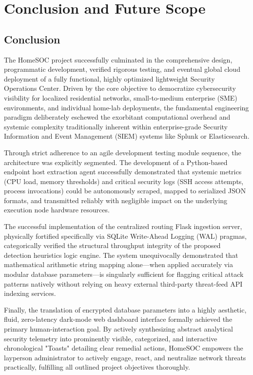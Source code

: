 \chapter{Conclusion and Future Scope}

\section{Conclusion}
The HomeSOC project successfully culminated in the comprehensive design, programmatic development, verified rigorous testing, and eventual global cloud deployment of a fully functional, highly optimized lightweight Security Operations Center. Driven by the core objective to democratize cybersecurity visibility for localized residential networks, small-to-medium enterprise (SME) environments, and individual home-lab deployments, the fundamental engineering paradigm deliberately eschewed the exorbitant computational overhead and systemic complexity traditionally inherent within enterprise-grade Security Information and Event Management (SIEM) systems like Splunk or Elasticsearch.

Through strict adherence to an agile development testing module sequence, the architecture was explicitly segmented. The development of a Python-based endpoint host extraction agent successfully demonstrated that systemic metrics (CPU load, memory thresholds) and critical security logs (SSH access attempts, process invocations) could be autonomously scraped, mapped to serialized JSON formats, and transmitted reliably with negligible impact on the underlying execution node hardware resources. 

The successful implementation of the centralized routing Flask ingestion server, physically fortified specifically via SQLite Write-Ahead Logging (WAL) pragmas, categorically verified the structural throughput integrity of the proposed detection heuristics logic engine. The system unequivocally demonstrated that mathematical arithmetic string mapping alone—when applied accurately via modular database parameters—is singularly sufficient for flagging critical attack patterns natively without relying on heavy external third-party threat-feed API indexing services. 

Finally, the translation of encrypted database parameters into a highly aesthetic, fluid, zero-latency dark-mode web dashboard interface formally achieved the primary human-interaction goal. By actively synthesizing abstract analytical security telemetry into prominently visible, categorized, and interactive chronological "Toasts" detailing clear remedial actions, HomeSOC empowers the layperson administrator to actively engage, react, and neutralize network threats practically, fulfilling all outlined project objectives thoroughly.

